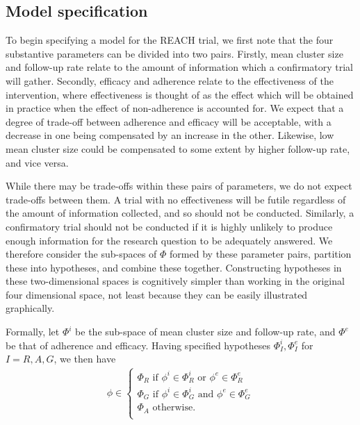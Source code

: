 \documentclass[AMA,STIX1COL]{WileyNJD-v2}
\begin{document}

\subsection{Model specification}

To begin specifying a model for the REACH trial, we first note that the four substantive parameters can be divided into two pairs. Firstly, mean cluster size and follow-up rate relate to the amount of information which a confirmatory trial will gather. Secondly, efficacy and adherence relate to the effectiveness of the intervention, where effectiveness is thought of as the effect which will be obtained in practice when the effect of non-adherence is accounted for. We expect that a degree of trade-off between adherence and efficacy will be acceptable, with a decrease in one being compensated by an increase in the other. Likewise, low mean cluster size could be compensated to some extent by higher follow-up rate, and vice versa. 

While there may be trade-offs within these pairs of parameters, we do not expect trade-offs between them. A trial with no effectiveness will be futile regardless of the amount of information collected, and so should not be conducted. Similarly, a confirmatory trial should not be conducted if it is highly unlikely to produce enough information for the research question to be adequately answered. We therefore consider the sub-spaces of $\Phi$ formed by these parameter pairs, partition these into hypotheses, and combine these together. Constructing hypotheses in these two-dimensional spaces is cognitively simpler than working in the original four dimensional space, not least because they can be easily illustrated graphically.

Formally, let $\Phi^i$ be the sub-space of mean cluster size and follow-up rate, and $\Phi^e$ be that of adherence and efficacy. Having specified hypotheses $\Phi^i_I, \Phi^e_I$ for $I = R,A,G$, we then have 
\begin{align}\label{eqn:comb_hyp}
\phi \in \begin{cases}
               \Phi_R \text{ if }  \phi^i \in \Phi^i_R \text{ or } \phi^e \in \Phi^e_R \\
               \Phi_G \text{ if }  \phi^i \in \Phi^i_G \text{ and } \phi^e \in \Phi^e_G \\
               \Phi_A \text{ otherwise}. \\
            \end{cases}
\end{align}
\end{document}
